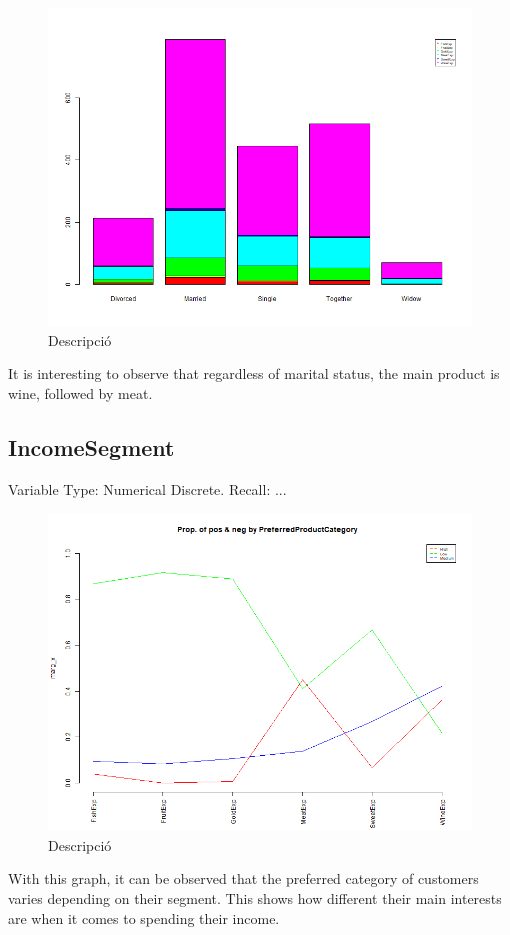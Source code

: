 \begin{figure}[H]
    \centering
    \includegraphics[width=0.8\linewidth]{Imatges/stacked_barplot_counts_PreferredProductCategory_10_legend.png}
    \caption{Descripció}
    \label{fig:scree_plot}
\end{figure}
\newline
It is interesting to observe that regardless of marital status, the main product is wine, followed by meat.

\subsection{IncomeSegment}
Variable Type: Numerical Discrete.\newline
Recall: ...

\begin{figure}[H]
    \centering
    \includegraphics[width=0.8\linewidth]{Imatges/prop_cond_col_var_x_PreferredProductCategory_8_legend.png}
    \caption{Descripció}
    \label{fig:scree_plot}
\end{figure}
\newline
With this graph, it can be observed that the preferred category of customers varies depending on their segment. This shows how different their main interests are when it comes to spending their income.

